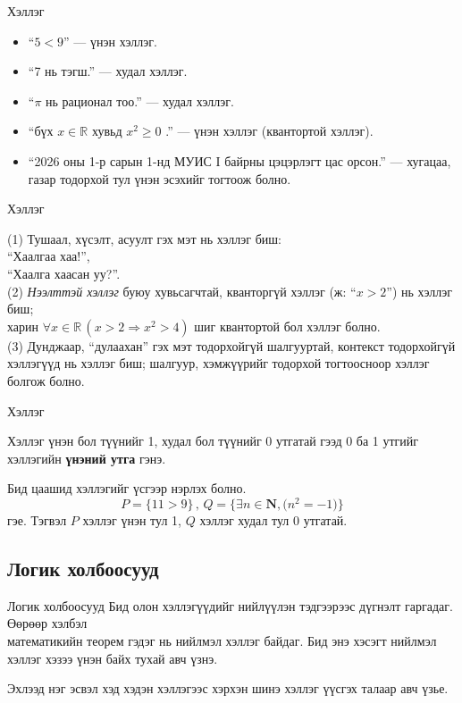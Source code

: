 \begin{frame}[allowframebreaks]{Хэллэг}
 \begin{example}
     \begin{itemize}
  \item ``$5<9$'' — үнэн хэллэг.
  \item ``7 нь тэгш.'' — худал хэллэг.
  \item ``$\pi$ нь рационал тоо.'' — худал хэллэг.
  \item ``бүх $x\in\mathbb{R}$ хувьд $x^2\ge 0$ .'' — үнэн хэллэг (квантортой хэллэг).
  \item ``2026 оны 1-р сарын 1-нд МУИС I байрны цэцэрлэгт цас орсон.'' — хугацаа, газар тодорхой тул үнэн эсэхийг тогтоож болно.
\end{itemize}
 \end{example}
\end{frame}

\begin{frame}[allowframebreaks]{Хэллэг}
\begin{remark}
(1) Тушаал, хүсэлт, асуулт гэх мэт нь хэллэг биш: \\
``Хаалгаа хаа!'', \\
``Хаалга хаасан уу?''. \\
(2) \emph{Нээлттэй хэллэг} буюу хувьсагчтай, кванторгүй хэллэг (ж: ``$x>2$'') нь хэллэг биш; \\
харин $\forall x\in\mathbb{R}\,(x>2 \Rightarrow x^2>4)$ шиг квантортой бол хэллэг болно. \\
(3) Дунджаар, ``дулаахан'' гэх мэт тодорхойгүй шалгууртай, контекст тодорхойгүй хэллэгүүд нь хэллэг биш; шалгуур, хэмжүүрийг тодорхой тогтоосноор хэллэг болгож болно.
\end{remark}
\end{frame}

\begin{frame}[allowframebreaks]{Хэллэг}
\begin{definition}
Хэллэг үнэн бол түүнийг 1, худал бол түүнийг 0 утгатай гээд 0 ба 1 утгийг хэллэгийн \textbf{үнэний утга} гэнэ.
\end{definition}
Бид цаашид хэллэгийг үсгээр нэрлэх болно. 
$$P=\{11>9\} \,,\, Q=\{\exists n\in\mathbf{N} ,  \big( n^2=-1\big)\}$$ гэе. Тэгвэл $P$ хэллэг үнэн тул 1, $Q$ хэллэг худал тул 0 утгатай.
\end{frame}

\subsection{Логик холбоосууд}
\begin{frame}[allowframebreaks]{Логик холбоосууд}
Бид олон хэллэгүүдийг нийлүүлэн тэдгээрээс дүгнэлт гаргадаг. Өөрөөр хэлбэл\\ математикийн теорем гэдэг нь нийлмэл хэллэг байдаг. Бид энэ хэсэгт нийлмэл хэллэг хэзээ үнэн байх тухай авч үзнэ. 

Эхлээд нэг эсвэл хэд хэдэн хэллэгээс хэрхэн шинэ хэллэг үүсгэх талаар авч үзье.
\end{frame}

